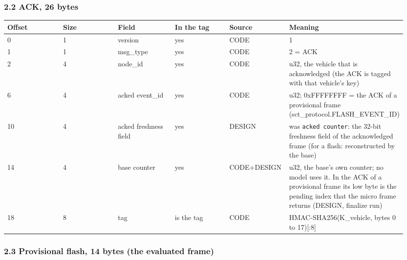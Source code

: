 \subsubsection*{2.2 ACK, 26 bytes}

{\scriptsize\raggedright
\begin{longtable}{p{0.158\linewidth}p{0.158\linewidth}p{0.158\linewidth}p{0.158\linewidth}p{0.158\linewidth}p{0.158\linewidth}}
\toprule
Offset & Size & Field & In the tag & Source & Meaning \\
\midrule
\endhead
0 & 1 & version & yes & CODE & 1 \\
1 & 1 & msg\_type & yes & CODE & 2 = ACK \\
2 & 4 & node\_id & yes & CODE & u32, the vehicle that is acknowledged (the ACK is tagged with that vehicle's key) \\
6 & 4 & acked event\_id & yes & CODE & u32; 0xFFFFFFFF = the ACK of a provisional frame (sct\_protocol.FLASH\_EVENT\_ID) \\
10 & 4 & acked freshness field & yes & DESIGN & was \texttt{acked counter}: the 32-bit freshness field of the acknowledged frame (for a flash: reconstructed by the base) \\
14 & 4 & base counter & yes & CODE+DESIGN & u32, the base's own counter; no model uses it. In the ACK of a provisional frame its low byte is the pending index that the micro frame returns (DESIGN, finalize run) \\
18 & 8 & tag & is the tag & CODE & HMAC-SHA256(K\_vehicle, bytes 0 to 17)[:8] \\
\bottomrule
\end{longtable}}

\subsubsection*{2.3 Provisional flash, 14 bytes (the evaluated frame)}

